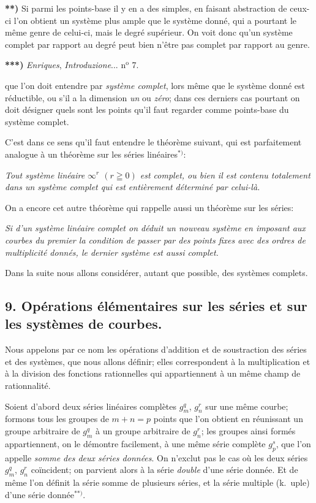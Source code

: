 \documentclass{article}
\begin{document}
\textbf{**)} Si parmi les points-base il y en a des simples, en faisant abstraction de ceux-ci l'on obtient un système plus ample que le système donné, qui a pourtant le même genre de celui-ci, mais le degré supérieur. On voit donc qu'un système complet par rapport au degré peut bien n'être pas complet par rapport au genre.

\textbf{***)} \emph{Enriques}, \emph{Introduzione}... n${}^{\text{o}}$ 7.

que l'on doit entendre par \emph{système complet}, lors même que le système donné est réductible, ou s'il a la dimension \emph{un} ou \emph{zéro}; dans ces derniers cas pourtant on doit désigner quels sont les points qu'il faut regarder comme points-base du système complet.

C'est dans ce sens qu'il faut entendre le théorème suivant, qui est parfaitement analogue à un théorème sur les séries linéaires${}^{*)}$:

\emph{Tout système linéaire $\infty^{r}$ $(r \geqq 0)$ est complet, ou bien il est contenu totalement dans un système complet qui est entièrement déterminé par celui-là.}

On a encore cet autre théorème qui rappelle aussi un théorème sur les séries:

\emph{Si d'un système linéaire complet on déduit un nouveau système en imposant aux courbes du premier la condition de passer par des points fixes avec des ordres de multiplicité donnés, le dernier système est aussi complet.}

Dans la suite nous allons considérer, autant que possible, des systèmes complets.

\subsection*{9. Opérations élémentaires sur les séries et sur les systèmes de courbes.}

Nous appelons par ce nom les opérations d'addition et de soustraction des séries et des systèmes, que nous allons définir; elles correspondent à la multiplication et à la division des fonctions rationnelles qui appartiennent à un même champ de rationnalité.

Soient d'abord deux séries linéaires complètes $g_{m}^{q}$, $g_{n}^{r}$ sur une même courbe; formons tous les groupes de $m + n = p$ points que l'on obtient en réunissant un groupe arbitraire de $g_{m}^{q}$ à un groupe arbitraire de $g_{n}^{r}$; les groupes ainsi formés appartiennent, on le démontre facilement, à une même série complète $g_{p}^{s}$, que l'on appelle \emph{somme des deux séries données}. On n'exclut pas le cas où les deux séries $g_{m}^{q}$, $g_{n}^{r}$ coïncident; on parvient alors à la série \emph{double} d'une série donnée. Et de même l'on définit la série somme de plusieurs séries, et la série multiple (k.\ uple) d'une série donnée${}^{**)}$.
\end{document}
